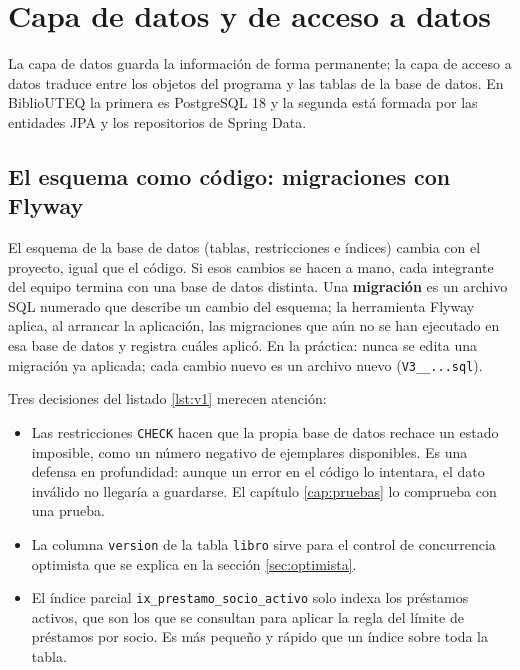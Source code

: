 \chapter{Capa de datos y de acceso a datos}\label{cap:datos}

La capa de datos guarda la información de forma permanente; la capa de acceso a datos traduce entre los objetos del programa y las tablas de la base de datos. En BiblioUTEQ la primera es PostgreSQL 18 y la segunda está formada por las entidades JPA y los repositorios de Spring Data.

\section{El esquema como código: migraciones con Flyway}

El esquema de la base de datos (tablas, restricciones e índices) cambia con el proyecto, igual que el código. Si esos cambios se hacen a mano, cada integrante del equipo termina con una base de datos distinta. Una \textbf{migración} es un archivo SQL numerado que describe un cambio del esquema; la herramienta Flyway aplica, al arrancar la aplicación, las migraciones que aún no se han ejecutado en esa base de datos y registra cuáles aplicó. En la práctica: nunca se edita una migración ya aplicada; cada cambio nuevo es un archivo nuevo (\texttt{V3\_\_...sql}).



Tres decisiones del listado \ref{lst:v1} merecen atención:

\begin{itemize}
	\item Las restricciones \texttt{CHECK} hacen que la propia base de datos rechace un estado imposible, como un número negativo de ejemplares disponibles. Es una defensa en profundidad: aunque un error en el código lo intentara, el dato inválido no llegaría a guardarse. El capítulo \ref{cap:pruebas} lo comprueba con una prueba.
	\item La columna \texttt{version} de la tabla \texttt{libro} sirve para el control de concurrencia optimista que se explica en la sección \ref{sec:optimista}.
	\item El índice parcial \texttt{ix\_prestamo\_socio\_activo} solo indexa los préstamos activos, que son los que se consultan para aplicar la regla del límite de préstamos por socio. Es más pequeño y rápido que un índice sobre toda la tabla.
\end{itemize}

